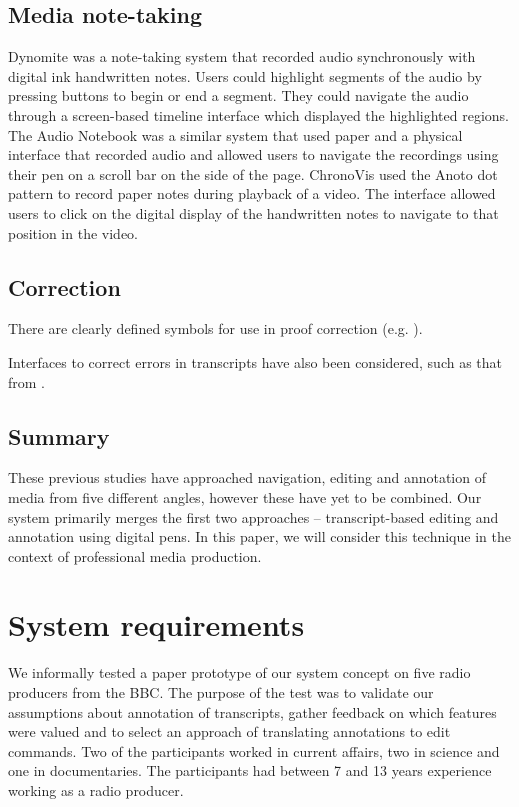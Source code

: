 \subsection{Media note-taking}
Dynomite \citep{Wilcox1997} was a note-taking system that recorded audio synchronously with digital ink handwritten
notes.  Users could highlight segments of the audio by pressing buttons to begin or end a segment. They could navigate
the audio through a screen-based timeline interface which displayed the highlighted regions.  The Audio Notebook
\citep{Stifelman2001} was a similar system that used paper and a physical interface that recorded audio and allowed
users to navigate the recordings using their pen on a scroll bar on the side of the page.  ChronoVis \citep{Fouse2011}
used the Anoto dot pattern to record paper notes during playback of a video. The interface allowed users to click on
the digital display of the handwritten notes to navigate to that position in the video.

\subsection{Correction}
There are clearly defined symbols for use in proof correction (e.g. \citet{ISO5776}).

Interfaces to correct errors in transcripts have also been considered, such as that from \citet{Suhm2001}.

\subsection{Summary}
These previous studies have approached navigation, editing and annotation of media from five different angles, however
these have yet to be combined.  Our system primarily merges the first two approaches -- transcript-based editing and
annotation using digital pens. In this paper, we will consider this technique in the context of professional media
production.

\section{System requirements}\label{sec:paper-requirements}




We informally tested a paper prototype of our system concept on five radio producers from the BBC. The purpose of the
test was to validate our assumptions about annotation of transcripts, gather feedback on which features were valued and
to select an approach of translating annotations to edit commands.  Two of the participants worked in current affairs,
two in science and one in documentaries. The participants had between 7 and 13 years experience working as a radio
producer.

